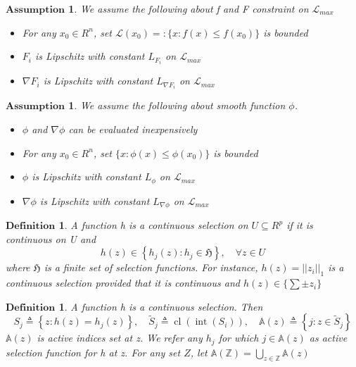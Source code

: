 \documentclass[10pt, oneside]{article}
\newtheorem{defn}[thm]{$\mathbf{Definition}$}
\newtheorem{asp}[thm]{$\mathbf{Assumption}$}
\begin{document}
\begin{asp}
\label{aspF}
We assume the following about f and F constraint on $\mathcal{L}_{max}$
\begin{itemize}
\item For any $x_0 \in R^n$, set $\mathcal{L}(x_0)=:\{x:f(x)\leq f(x_0)\}$ is bounded
\item $F_i$ is Lipschitz with constant $L_{F_i}$ on $\mathcal{L}_{max}$
\item $\nabla F_i$ is Lipschitz with constant $L_{\nabla F_i}$ on $\mathcal{L}_{max}$
\end{itemize}
\end{asp}

\begin{asp}
We assume the following about smooth function $\phi$.
\begin{itemize}
\item $\phi$ and $\nabla\phi$ can be evaluated inexpensively
\item For any $x_0 \in R^n$, set $\{x:\phi(x)\leq \phi(x_0)\}$ is bounded
\item $\phi$ is Lipschitz with constant $L_{\phi}$ on $\mathcal{L}_{max}$
\item $\nabla \phi$ is Lipschitz with constant $L_{\nabla\phi}$ on $\mathcal{L}_{max}$
\end{itemize}
\end{asp}

\begin{defn}
A function h is a continuous selection on $U \subseteq R^{p}$ if it is continuous on U and 
$$
h(z) \in\left\{h_{j}(z): h_{j} \in \mathfrak{H}\right\}, \quad \forall z \in U
$$
where $\mathfrak{H}$ is a finite set of selection functions. For instance, $h(z)=||z_i||_1$ is a continuous selection provided that it is continuous and $h(z)\in \{\sum\pm z_i\}$
\end{defn}

\begin{defn}
A function h is a continuous selection. Then 
$$
S_{j} \triangleq\left\{z: h(z)=h_{j}(z)\right\}, \quad \tilde{S}_{j} \triangleq \operatorname{cl}\left(\operatorname{int}\left(S_{i}\right)\right), \quad \mathbb{A}(z) \triangleq\left\{j: z \in \tilde{S}_{j}\right\}
$$
$\mathbb{A}(z)$ is active indices set at z. We refer any $h_j$ for which $j\in \mathbb{A}(z)$ as active selection function for h at z. For any set $Z$, let $\mathbb{A}(\mathbb{Z})=\bigcup_{z \in \mathbb{Z}} \mathbb{A}(z)$
\end{defn}
\end{document}
